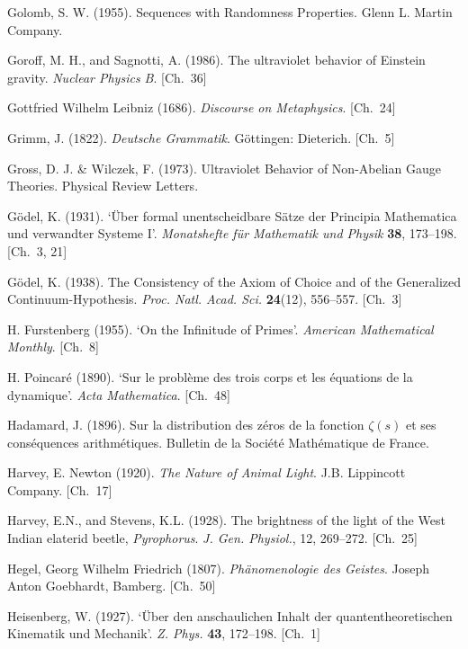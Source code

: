 \begin{list}{}{%
  \setlength{\leftmargin}{2em}%
  \setlength{\itemindent}{-2em}%
  \setlength{\itemsep}{0.35\baselineskip}%
  \setlength{\parsep}{0pt}%
  \setlength{\topsep}{0.5em}}
\item Golomb, S. W. (1955). Sequences with Randomness Properties. Glenn L. Martin Company.
\item Goroff, M. H., and Sagnotti, A. (1986). The ultraviolet behavior of Einstein gravity. \textit{Nuclear Physics B}. \hfill {\scriptsize [Ch.~36]}
\item Gottfried Wilhelm Leibniz (1686). \textit{Discourse on Metaphysics}. \hfill {\scriptsize [Ch.~24]}
\item Grimm, J. (1822). \textit{Deutsche Grammatik}. Göttingen: Dieterich. \hfill {\scriptsize [Ch.~5]}
\item Gross, D. J. \& Wilczek, F. (1973). Ultraviolet Behavior of Non-Abelian Gauge Theories. Physical Review Letters.
\item Gödel, K. (1931). `Über formal unentscheidbare Sätze der Principia Mathematica und verwandter Systeme I'. \textit{Monatshefte für Mathematik und Physik} \textbf{38}, 173–198. \hfill {\scriptsize [Ch.~3, 21]}
\item Gödel, K. (1938). The Consistency of the Axiom of Choice and of the Generalized Continuum-Hypothesis. \textit{Proc. Natl. Acad. Sci.} \textbf{24}(12), 556–557. \hfill {\scriptsize [Ch.~3]}
\item H. Furstenberg (1955). `On the Infinitude of Primes'. \textit{American Mathematical Monthly}. \hfill {\scriptsize [Ch.~8]}
\item H. Poincaré (1890). `Sur le problème des trois corps et les équations de la dynamique'. \textit{Acta Mathematica}. \hfill {\scriptsize [Ch.~48]}
\item Hadamard, J. (1896). Sur la distribution des z\'eros de la fonction $\zeta(s)$ et ses cons\'equences arithm\'etiques. Bulletin de la Soci\'et\'e Math\'ematique de France.
\item Harvey, E. Newton (1920). \textit{The Nature of Animal Light}. J.B. Lippincott Company. \hfill {\scriptsize [Ch.~17]}
\item Harvey, E.N., and Stevens, K.L. (1928). The brightness of the light of the West Indian elaterid beetle, \textit{Pyrophorus}. \textit{J. Gen. Physiol.}, 12, 269–272. \hfill {\scriptsize [Ch.~25]}
\item Hegel, Georg Wilhelm Friedrich (1807). \textit{Phänomenologie des Geistes}. Joseph Anton Goebhardt, Bamberg. \hfill {\scriptsize [Ch.~50]}
\item Heisenberg, W. (1927). `Über den anschaulichen Inhalt der quantentheoretischen Kinematik und Mechanik'. \textit{Z. Phys.} \textbf{43}, 172–198. \hfill {\scriptsize [Ch.~1]}

\end{list}
